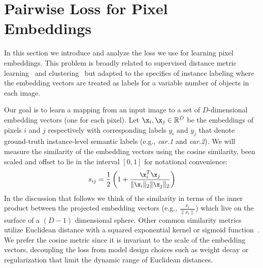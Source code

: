 \section{Pairwise Loss for Pixel Embeddings}
\label{sec:max-margin}
In this section we introduce and analyze the loss we use for learning pixel
embeddings. This problem is broadly related to supervised distance metric
learning~\cite{weinberger2009distance,kong2012dictionary, kong2013learning} and clustering~\cite{kong2012multi}
but adapted to the specifics of instance labeling where
the embedding vectors are treated as labels for a variable number of objects in
each image.

Our goal is to learn a mapping from an input image to a set of $D$-dimensional
embedding vectors (one for each pixel).  Let $\x_i,\x_j \in {\mathbb R}^D$ be the
embeddings of pixels $i$ and $j$ respectively with corresponding labels $y_i$
and $y_j$ that denote ground-truth instance-level semantic labels (e.g., {\em
car.1} and {\em car.2}). We will measure the similarity of the embedding vectors
using the cosine similarity, been scaled and offset to lie in the interval
$[0,1]$ for notational convenience:
\begin{equation}
\begin{split} \small
s_{ij} = \frac{1}{2}\left(1 + \frac{\x_i^T\x_j}{\Vert\x_i\Vert_2 \Vert\x_j\Vert_2}\right)
\end{split}
\label{eq:calibrated_cosine_similarity}
\end{equation}
In the discussion that follows we think of the similarity in terms of the inner
product between the projected embedding vectors (e.g., $\frac{x_i}{\|x_i\|}$)
which live on the surface of a $(D-1)$ dimensional sphere.  Other common
similarity metrics utilize Euclidean distance with a squared exponential kernel
or sigmoid function~\cite{newell2016associative, fathi2017semantic}. We prefer
the cosine metric since it is invariant to the scale of the embedding vectors,
decoupling the loss from model design choices such as weight decay or
regularization that limit the dynamic range of Euclidean distances.

